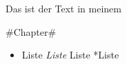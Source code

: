 Das ist der Text in meinem

\#Chapter\#

\begin{itemize}
\tightlist
\item
  Liste \emph{Liste }Liste *Liste
\end{itemize}
